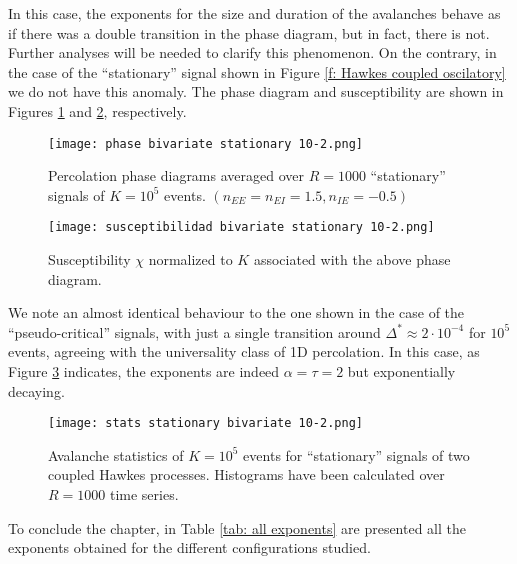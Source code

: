 In this case, the exponents for the size and duration of the avalanches behave as if there was a double transition in the phase diagram, but in fact, there is not. Further analyses will be needed
to clarify this phenomenon. On the contrary, in the case of 
the ``stationary'' signal shown in Figure \ref{f: Hawkes coupled oscilatory} we do not have this anomaly. The phase diagram and susceptibility are shown in Figures 
\ref{f:phase_diagram_coupled oscilatory} and \ref{f:susceptibilidad_coupled oscilatory}, respectively.

\begin{figure}[H]
    \centering
    \texttt{[image: phase bivariate stationary 10-2.png]}
    \caption{Percolation phase diagrams averaged over $R=1000$ ``stationary'' signals of $K=10^5$ events. $\left( n_{EE}=n_{EI}=1.5, n_{IE}=-0.5 \right)$}
    \label{f:phase_diagram_coupled oscilatory}
\end{figure}

\begin{figure}[H]
    \centering
    \texttt{[image: susceptibilidad bivariate stationary 10-2.png]}
    \caption{Susceptibility $\chi$ normalized to $K$ associated with the above phase diagram.}
    \label{f:susceptibilidad_coupled oscilatory}
\end{figure}

We note an almost identical behaviour to the one shown in the case of the ``pseudo-critical'' signals, with just a single transition around $\Delta^*\approx 2\cdot 10^{-4}$ for $10^5$ events, 
agreeing with the universality class of 1D percolation. In this case, as Figure \ref{f: stats oscilatory} 
indicates, the exponents are indeed $\alpha=\tau=2$ but exponentially decaying.

\begin{figure}[H]
    \centering
    \texttt{[image: stats stationary bivariate 10-2.png]}
    \caption{Avalanche statistics of $K=10^5$ events for ``stationary'' signals of two coupled Hawkes processes. Histograms have been calculated over $R=1000$ time series.}
    \label{f: stats oscilatory}
\end{figure}

To conclude the chapter, in Table \ref{tab: all exponents} are presented all the exponents obtained for the different configurations studied.


